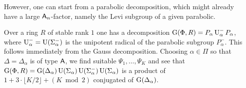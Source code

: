 However, one can start from a parabolic decomposition, which might already have a large $\mathsf{A}_n$-factor, namely the Levi subgroup of a given parabolic.

Over a ring $R$ of stable rank $1$ one has a decomposition $\operatorname{G}(\Phi,R)=P_\alpha\operatorname{U}_\alpha^-P_\alpha$, where $\operatorname{U}_\alpha^-=\operatorname{U}(\Sigma_\alpha^-)$ is the unipotent radical of the parabolic subgroup $P_\alpha^-$. This follows immediately from the Gauss decomposition. Choosing $\alpha\in\Pi$ so that $\Delta=\Delta_\alpha$ is of type $\mathsf{A}$, we find suitable $\Psi_1,\ldots,\Psi_K$ and see that $\operatorname{G}(\Phi,R)=\operatorname{G}(\Delta_\alpha)\operatorname{U}(\Sigma_\alpha)\operatorname{U}(\Sigma_\alpha^-)\operatorname{U}(\Sigma_\alpha)$ is a product of $1+3\cdot\lfloor K/2\rfloor+(K\bmod2)$ conjugated of $\operatorname{G}(\Delta_\alpha)$.